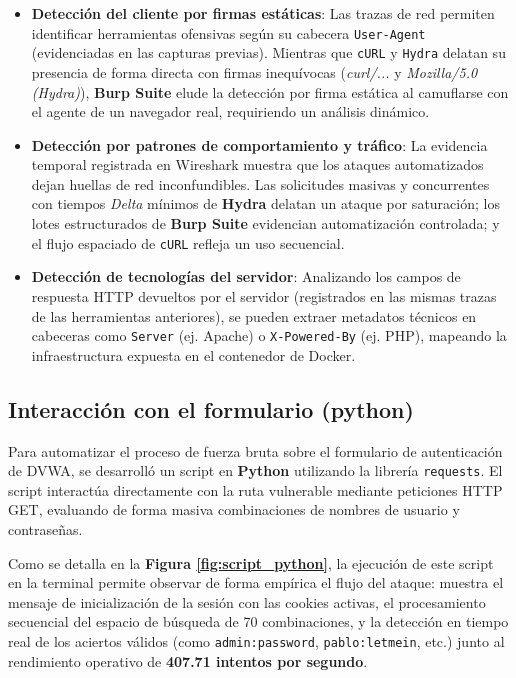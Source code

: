 \documentclass[letter,12pt]{article}
\begin{document}
\begin{itemize}
    \item \textbf{Detección del cliente por firmas estáticas}: Las trazas de red permiten identificar herramientas ofensivas según su cabecera \texttt{User-Agent} (evidenciadas en las capturas previas). Mientras que \texttt{cURL} y \texttt{Hydra} delatan su presencia de forma directa con firmas inequívocas (\textit{curl/...} y \textit{Mozilla/5.0 (Hydra)}), \textbf{Burp Suite} elude la detección por firma estática al camuflarse con el agente de un navegador real, requiriendo un análisis dinámico.
    \item \textbf{Detección por patrones de comportamiento y tráfico}: La evidencia temporal registrada en Wireshark muestra que los ataques automatizados dejan huellas de red inconfundibles. Las solicitudes masivas y concurrentes con tiempos \textit{Delta} mínimos de \textbf{Hydra} delatan un ataque por saturación; los lotes estructurados de \textbf{Burp Suite} evidencian automatización controlada; y el flujo espaciado de \texttt{cURL} refleja un uso secuencial.
    \item \textbf{Detección de tecnologías del servidor}: Analizando los campos de respuesta HTTP devueltos por el servidor (registrados en las mismas trazas de las herramientas anteriores), se pueden extraer metadatos técnicos en cabeceras como \texttt{Server} (ej. Apache) o \texttt{X-Powered-By} (ej. PHP), mapeando la infraestructura expuesta en el contenedor de Docker.
\end{itemize}

\subsection{Interacción con el formulario (python)}

Para automatizar el proceso de fuerza bruta sobre el formulario de autenticación de DVWA, se desarrolló un script en \textbf{Python} utilizando la librería \texttt{requests}. El script interactúa directamente con la ruta vulnerable mediante peticiones HTTP GET, evaluando de forma masiva combinaciones de nombres de usuario y contraseñas.

Como se detalla en la \textbf{Figura \ref{fig:script_python}}, la ejecución de este script en la terminal permite observar de forma empírica el flujo del ataque: muestra el mensaje de inicialización de la sesión con las cookies activas, el procesamiento secuencial del espacio de búsqueda de 70 combinaciones, y la detección en tiempo real de los aciertos válidos (como \texttt{admin:password}, \texttt{pablo:letmein}, etc.) junto al rendimiento operativo de \textbf{407.71 intentos por segundo}.
\end{document}
